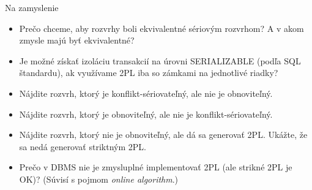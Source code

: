 \documentclass[12pt]{beamer}
\begin{document}
\begin{frame}{Na zamyslenie}
\begin{itemize}
\item Prečo chceme, aby rozvrhy boli ekvivalentné sériovým rozvrhom? A v akom zmysle majú byť ekvivalentné?
\item Je možné získať izoláciu transakcií na úrovni SERIALIZABLE (podľa SQL štandardu), ak využívame 2PL iba so zámkami na jednotlivé riadky?
\item Nájdite rozvrh, ktorý je konflikt-sériovateľný, ale nie je obnoviteľný.
\item Nájdite rozvrh, ktorý je obnoviteľný, ale nie je konflikt-sériovateľný.
\item Nájdite rozvrh, ktorý nie je obnoviteľný, ale dá sa generovať 2PL. Ukážte, že sa nedá generovať striktným 2PL.
\item Prečo v DBMS nie je zmysluplné implementovať 2PL (ale strikné 2PL je OK)? (Súvisí s pojmom \emph{online algorithm}.)
\end{itemize}
\end{frame}
\end{document}
